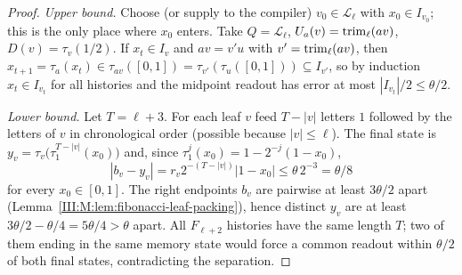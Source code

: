\begin{proof}
\emph{Upper bound.} Choose (or supply to the compiler) $v_0\in\mathcal L_\ell$ with $x_0\in I_{v_0}$; this is the only
place where $x_0$ enters. Take $Q=\mathcal L_\ell$, $U_a(v)=\operatorname{trim}_\ell(av)$,
$D(v)=\tau_v(1/2)$. If $x_t\in I_v$ and $av=v'u$ with $v'=\operatorname{trim}_\ell(av)$, then
$x_{t+1}=\tau_a(x_t)\in\tau_{av}([0,1])=\tau_{v'}(\tau_u([0,1]))\subseteq I_{v'}$, so by
induction $x_t\in I_{v_t}$ for all histories and the midpoint readout has error at most
$|I_{v_t}|/2\le\theta/2$.

\emph{Lower bound.} Let $T=\ell+3$. For each leaf $v$ feed $T-|v|$ letters $1$ followed by
the letters of $v$ in chronological order (possible because $|v|\le\ell$). The final state
is $y_v=\tau_v\bigl(\tau_1^{T-|v|}(x_0)\bigr)$ and, since $\tau_1^j(x_0)=1-2^{-j}(1-x_0)$,
\[
|b_v-y_v|=r_v2^{-(T-|v|)}|1-x_0|\le\theta\,2^{-3}=\theta/8
\]
for every $x_0\in[0,1]$. The right endpoints $b_v$ are pairwise at least $3\theta/2$ apart
(Lemma~\ref{III:M:lem:fibonacci-leaf-packing}), hence distinct $y_v$ are
at least $3\theta/2-\theta/4=5\theta/4>\theta$ apart. All $F_{\ell+2}$ histories have the
same length $T$; two of them ending in the same memory state would force a common
readout within $\theta/2$ of both final states, contradicting the separation.
\end{proof}
